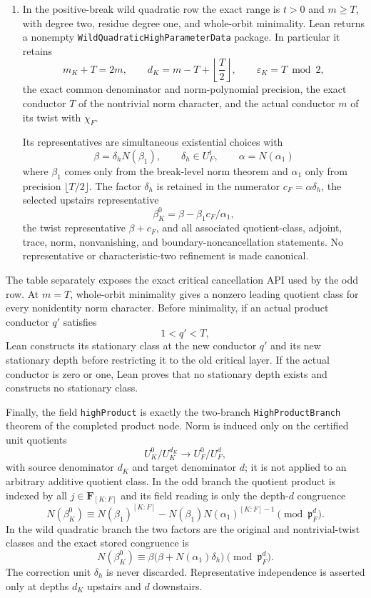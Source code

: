 \begin{theorem}
\begin{enumerate}
\item In the positive-break wild quadratic row the exact range is
$t>0$ and $m\geq T$, with degree two, residue degree one, and whole-orbit
minimality.  Lean returns a nonempty
\texttt{WildQuadraticHighParameterData} package.  In particular it retains
\[
 m_K+T=2m,
 \qquad d_K=m-T+\left\lfloor\frac T2\right\rfloor,
 \qquad \varepsilon_K=T\bmod 2,
\]
the exact common denominator and norm-polynomial precision, the exact
conductor $T$ of the nontrivial norm character, and the actual conductor $m$
of its twist with $\chi_F$.

Its representatives are simultaneous existential choices with
\[
 \beta=\delta_hN(\beta_1),
 \qquad \delta_h\in U_F^t,
 \qquad \alpha=N(\alpha_1)
\]
where $\beta_1$ comes only from the break-level norm theorem and $\alpha_1$
only from precision $\lfloor T/2\rfloor$.  The factor $\delta_h$ is retained
in the numerator $c_F=\alpha\delta_h$, the selected upstairs representative
\[
 \beta_K^0=\beta-\beta_1c_F/\alpha_1,
\]
the twist representative $\beta+c_F$, and all associated quotient-class,
adjoint, trace, norm, nonvanishing, and boundary-noncancellation statements.
No representative or characteristic-two refinement is made canonical.
\end{enumerate}

The table separately exposes the exact critical cancellation API used by the
odd row.  At $m=T$, whole-orbit minimality gives a nonzero leading quotient
class for every nonidentity norm character.  Before minimality, if an actual
product conductor $q'$ satisfies
\[
 1<q'<T,
\]
Lean constructs its stationary class at the new conductor $q'$ and its new
stationary depth before restricting it to the old critical layer.  If the
actual conductor is zero or one, Lean proves that no stationary depth exists
and constructs no stationary class.

Finally, the field \texttt{highProduct} is exactly the two-branch
\texttt{HighProductBranch} theorem of the completed product node.  Norm is
induced only on the certified unit quotients
\[
 U_K^0/U_K^{d_K}\longrightarrow U_F^0/U_F^d,
\]
with source denominator $d_K$ and target denominator $d$; it is not applied
to an arbitrary additive quotient class.  In the odd branch the quotient
product is indexed by all $j\in\mathbf F_{[K:F]}$ and its field reading is
only the depth-$d$ congruence
\[
 N(\beta_K^0)\equiv
 N(\beta_1)^{[K:F]}-
 N(\beta_1)N(\alpha_1)^{[K:F]-1}
 \pmod{\mathfrak p_F^d}.
\]
In the wild quadratic branch the two factors are the original and
nontrivial-twist classes and the exact stored congruence is
\[
 N(\beta_K^0)\equiv
 \beta\bigl(\beta+N(\alpha_1)\delta_h\bigr)
 \pmod{\mathfrak p_F^d}.
\]
The correction unit $\delta_h$ is never discarded.  Representative
independence is asserted only at depths $d_K$ upstairs and $d$ downstairs.


\end{theorem}
